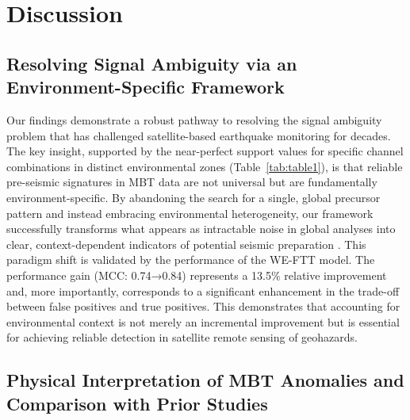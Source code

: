 \documentclass[preprint,review,12pt,authoryear]{elsarticle}
\begin{document}
\section{Discussion}\label{sec:discussion}

\subsection{Resolving Signal Ambiguity via an Environment-Specific Framework}\label{sec:discuss_ambiguity}

Our findings demonstrate a robust pathway to resolving the signal ambiguity problem that has challenged satellite-based earthquake monitoring for decades. The key insight, supported by the near-perfect support values for specific channel combinations in distinct environmental zones (Table~\ref{tab:table1}), is that reliable pre-seismic signatures in MBT data are not universal but are fundamentally environment-specific. By abandoning the search for a single, global precursor pattern and instead embracing environmental heterogeneity, our framework successfully transforms what appears as intractable noise in global analyses into clear, context-dependent indicators of potential seismic preparation \citep{qiSpatiotemporallyWeightedTwostep2020,qiMicrowaveBrightnessTemperature2022,wuIdentifyingSeismicAnomalies2024}. This paradigm shift is validated by the performance of the WE-FTT model. The performance gain (MCC: 0.74→0.84) represents a 13.5\% relative improvement and, more importantly, corresponds to a significant enhancement in the trade-off between false positives and true positives. This demonstrates that accounting for environmental context is not merely an incremental improvement but is essential for achieving reliable detection in satellite remote sensing of geohazards.

\subsection{Physical Interpretation of MBT Anomalies and Comparison with Prior Studies}\label{sec:discuss_physical}
\end{document}
